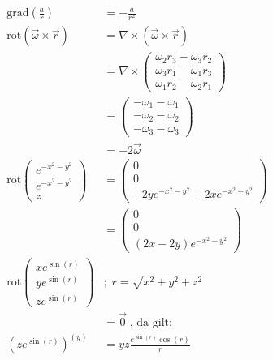 \documentclass[12pt,a4paper,notitlepage]{article}
\newcommand{\grad}{\text{grad}}
\newcommand{\rot}{\text{rot}}
\begin{document}
\begin{align}
\grad\left(\frac{a}{r}\right)&=-\frac{a}{r^2}\\
\rot(\vec\omega\times\vec r)&=\nabla\times(\vec\omega\times\vec r)\\
&=\nabla\times\left(\begin{matrix}
\omega_2r_3-\omega_3r_2\\
\omega_3r_1-\omega_1r_3\\
\omega_1r_2-\omega_2r_1
\end{matrix}\right)\\
&=\left(\begin{matrix}
-\omega_1-\omega_1\\
-\omega_2-\omega_2\\
-\omega_3-\omega_3
\end{matrix}\right)\\
&=-2\vec\omega\\
\rot\left(\begin{matrix}
e^{-x^2-y^2}\\
e^{-x^2-y^2}\\
z
\end{matrix}\right)&=\left(\begin{matrix}
0\\
0\\
-2ye^{-x^2-y^2}+2xe^{-x^2-y^2}
\end{matrix}\right)\\
&=\left(\begin{matrix}
0\\
0\\
(2x-2y)e^{-x^2-y^2}
\end{matrix}\right)\\
\rot\left(\begin{matrix}
xe^{\sin(r)}\\
ye^{\sin(r)}\\
ze^{\sin(r)}
\end{matrix}\right)&;\;r=\sqrt{x^2+y^2+z^2}\\
&=\vec 0\;\text{, da gilt: }\\
\left(ze^{\sin(r)}\right)^{(y)}&=yz\frac{e^{\sin(r)}\cos(r)}{r}
\end{align}
\end{document}
